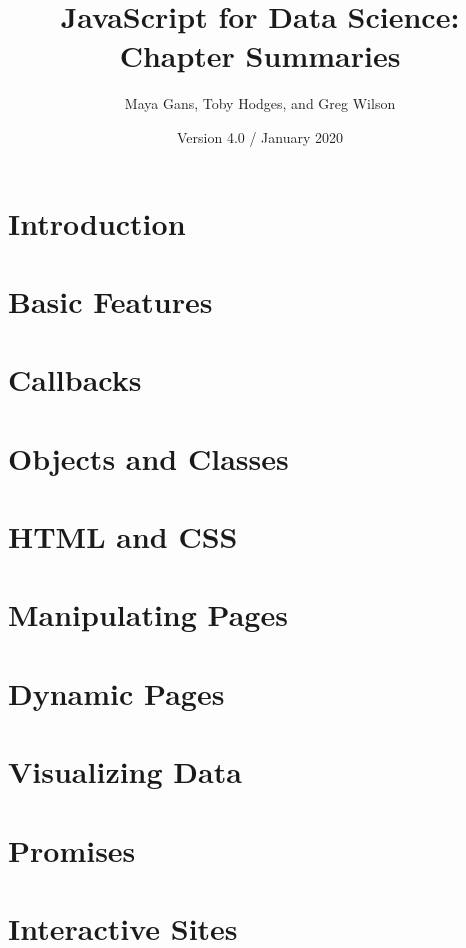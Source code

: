 \documentclass{article}
\begin{document}
\title{JavaScript for Data Science: Chapter Summaries}
\author{Maya Gans, Toby Hodges, and Greg Wilson}
\date{Version 4.0 / January 2020}
\maketitle

\section{Introduction}

\section{Basic Features}

\section{Callbacks}

\section{Objects and Classes}

\section{HTML and CSS}

\section{Manipulating Pages}

\section{Dynamic Pages}

\section{Visualizing Data}

\section{Promises}

\section{Interactive Sites}
\end{document}
